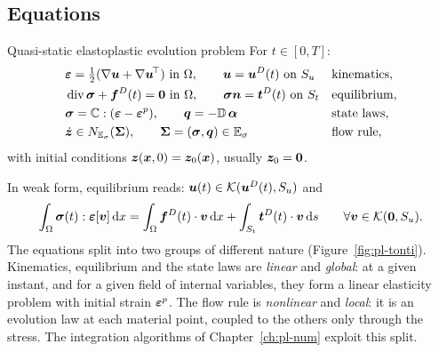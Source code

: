\subsection{Equations}\label{ssec:pl-bvp-eq}
%
\begin{gbox}{Quasi-static elastoplastic evolution problem}
For $t\in[0,T]$:
\begin{align}
  &\bm{\varepsilon}=\tfrac12(\nabla\bm{u}+\nabla\bm{u}^{\!\top})\ \text{in }\Omega,\qquad \bm{u}=\bm{u}^{D}(t)\ \text{on }S_u
  &&\text{kinematics},\label{eq:pl-bvp-kin}\\
  &\operatorname{div}\bm{\sigma}+\bm{f}^{D}(t)=\bm{0}\ \text{in }\Omega,\qquad \bm{\sigma}\bm{n}=\bm{t}^{D}(t)\ \text{on }S_t
  &&\text{equilibrium},\label{eq:pl-bvp-eq}\\
  &\bm{\sigma}=\mathbb{C}:(\bm{\varepsilon}-\bm{\varepsilon}^{p}),\qquad \bm{q}=-\mathbb{D}\,\bm{\alpha}
  &&\text{state laws},\label{eq:pl-bvp-state}\\
  &\dot{\bm{z}}\in N_{\mathbb{E}_{\sigma}}(\bm{\Sigma}),\qquad \bm{\Sigma}=(\bm{\sigma},\bm{q})\in\mathbb{E}_{\sigma}
  &&\text{flow rule},\label{eq:pl-bvp-flow}
\end{align}
with initial conditions $\bm{z}(\bm{x},0)=\bm{z}_0(\bm{x})$, usually $\bm{z}_0=\bm{0}$.
\end{gbox}
\noindent In weak form, equilibrium reads: $\bm{u}(t)\in\mathcal{K}(\bm{u}^{D}(t),S_u)$ and
\begin{equation}\label{eq:pl-bvp-weak}
  \int_\Omega\bm{\sigma}(t):\bm{\varepsilon}[\bm{v}]\,\mathrm{d} x=\int_\Omega\bm{f}^{D}(t)\cdot\bm{v}\,\mathrm{d} x+\int_{S_t}\bm{t}^{D}(t)\cdot\bm{v}\,\mathrm{d} s
  \qquad\forall\bm{v}\in\mathcal{K}(\bm{0},S_u).
\end{equation}
The equations split into two groups of different nature
(Figure~\ref{fig:pl-tonti}). Kinematics, equilibrium and the state laws are
\emph{linear} and \emph{global}: at a given instant, and for a given field of
internal variables, they form a linear elasticity problem with initial strain
$\bm{\varepsilon}^{p}$. The flow rule is \emph{nonlinear} and \emph{local}: it is an
evolution law at each material point, coupled to the others only through the
stress. The integration algorithms of Chapter~\ref{ch:pl-num} exploit this
split.

